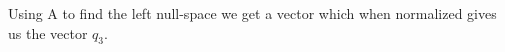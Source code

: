 					Using A to find the left null-space we get a vector which when normalized gives us the vector $q_3$.
